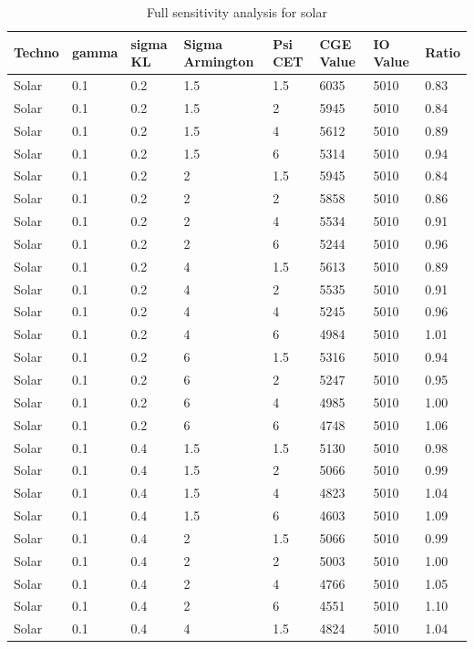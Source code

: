 \begin{table}
	\small
	\centering
	\caption{Full sensitivity analysis for solar}
	\begin{tabular}{llllllll}
		\toprule
		Techno & gamma & sigma KL & Sigma Armington & Psi CET & CGE Value & IO Value & Ratio \\
		\midrule
		Solar & 0.1 & 0.2 & 1.5 & 1.5 & 6035 & 5010 & 0.83 \\
		Solar & 0.1 & 0.2 & 1.5 & 2 & 5945 & 5010 & 0.84 \\
		Solar & 0.1 & 0.2 & 1.5 & 4 & 5612 & 5010 & 0.89 \\
		Solar & 0.1 & 0.2 & 1.5 & 6 & 5314 & 5010 & 0.94 \\
		Solar & 0.1 & 0.2 & 2 & 1.5 & 5945 & 5010 & 0.84 \\
		Solar & 0.1 & 0.2 & 2 & 2 & 5858 & 5010 & 0.86 \\
		Solar & 0.1 & 0.2 & 2 & 4 & 5534 & 5010 & 0.91 \\
		Solar & 0.1 & 0.2 & 2 & 6 & 5244 & 5010 & 0.96 \\
		Solar & 0.1 & 0.2 & 4 & 1.5 & 5613 & 5010 & 0.89 \\
		Solar & 0.1 & 0.2 & 4 & 2 & 5535 & 5010 & 0.91 \\
		Solar & 0.1 & 0.2 & 4 & 4 & 5245 & 5010 & 0.96 \\
		Solar & 0.1 & 0.2 & 4 & 6 & 4984 & 5010 & 1.01 \\
		Solar & 0.1 & 0.2 & 6 & 1.5 & 5316 & 5010 & 0.94 \\
		Solar & 0.1 & 0.2 & 6 & 2 & 5247 & 5010 & 0.95 \\
		Solar & 0.1 & 0.2 & 6 & 4 & 4985 & 5010 & 1.00 \\
		Solar & 0.1 & 0.2 & 6 & 6 & 4748 & 5010 & 1.06 \\
		Solar & 0.1 & 0.4 & 1.5 & 1.5 & 5130 & 5010 & 0.98 \\
		Solar & 0.1 & 0.4 & 1.5 & 2 & 5066 & 5010 & 0.99 \\
		Solar & 0.1 & 0.4 & 1.5 & 4 & 4823 & 5010 & 1.04 \\
		Solar & 0.1 & 0.4 & 1.5 & 6 & 4603 & 5010 & 1.09 \\
		Solar & 0.1 & 0.4 & 2 & 1.5 & 5066 & 5010 & 0.99 \\
		Solar & 0.1 & 0.4 & 2 & 2 & 5003 & 5010 & 1.00 \\
		Solar & 0.1 & 0.4 & 2 & 4 & 4766 & 5010 & 1.05 \\
		Solar & 0.1 & 0.4 & 2 & 6 & 4551 & 5010 & 1.10 \\
		Solar & 0.1 & 0.4 & 4 & 1.5 & 4824 & 5010 & 1.04 \\

\end{tabular}
\end{table}
